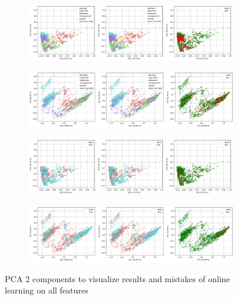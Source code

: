\begin{figure}[ht]
    \centering
    \begin{subfigure}[b]{\textwidth}
        \includegraphics[width=\textwidth]{assets/design/pca-scatter-online-fault-temporal.png}
        \caption{}
    \end{subfigure}
    \hfill
    \begin{subfigure}[b]{\textwidth}
        \includegraphics[width=\textwidth]{assets/design/pca-scatter-online-fault-spectral.png}
        \caption{}
    \end{subfigure}
    \begin{subfigure}[b]{\textwidth}
        \includegraphics[width=\textwidth]{assets/design/pca-scatter-online-anomaly60-temporal.png}
        \caption{}
    \end{subfigure}
    \hfill
    \begin{subfigure}[b]{\textwidth}
        \includegraphics[width=\textwidth]{assets/design/pca-scatter-online-anomaly60-spectral.png}
        \caption{}
    \end{subfigure}
    \caption{PCA 2 components to visualize results and mistakes of online learning on all features}
\end{figure}


